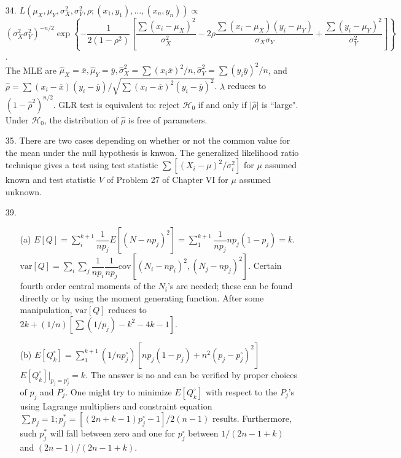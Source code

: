 \begin{enumerate}
	\item[34.] $L(\mu_X,\mu_Y,\sigma_X^2,\sigma_Y^2,\rho; (x_1,y_1),\ldots,(x_n,y_n)) \propto$ \\
	$(\sigma_X^2\sigma_Y^2)^{-n/2}\exp\left\{-\dfrac{1}{2(1-\rho^2)}\left[\dfrac{\sum(x_i-\mu_X)^2}{\sigma_X^2} -2\rho\dfrac{\sum(x_i-\mu_X)(y_i-\mu_Y)}{\sigma_X\sigma_Y} + \dfrac{\sum(y_i-\mu_Y)^2}{\sigma^2_Y}\right]\right\}$. \\
	The MLE are $\hat{\mu}_X=\overline{x},\hat{\mu}_Y=\overline{y}, \hat{\sigma}^2_X=\sum(x_i\overline{x})^2/n, \hat{\sigma}^2_Y=\sum(y_i\overline{y})^2/n$, and $\hat{\rho} = \sum(x_i-\overline{x})(y_i-\overline{y})/\sqrt{\sum(x_i-\overline{x})^2(y_i-\overline{y})^2}$. $\lambda$ reduces to $(1-\hat{\rho}^2)^{n/2}$. GLR test is equivalent to: reject $\mathscr{H}_0$ if and only if $\vert\hat{\rho}\vert$ is ``large".  Under $\mathscr{H}_0$, the distribution of $\hat{\rho}$ is free of parameters. 
	
	\item[35.] There are two cases depending on whether or not the common value for the mean under the null hypothesis is knwon. The generalized likelihood ratio technique gives a test using test statistic $\sum[(X_i-\mu)^2/\sigma_i^2]$ for $\mu$ assumed known and test statistic $V$ of Problem 27 of Chapter VI for $\mu$ assumed unknown.
	
	\item[39.] \begin{enumerate}
		\item[(a)] $E[Q] = \sum\limits_{i}^{k+1}\dfrac{1}{np_j}E[(N-np_j)^2] = \sum\limits_{1}^{k+1}\dfrac{1}{np_j}np_j(1-p_j) = k$. \\
		$\mbox{var}[Q] = \sum\limits_{i}\sum\limits_{j}\dfrac{1}{np_i}\dfrac{1}{np_j}\mbox{cov}[(N_i-np_i)^2,(N_j-np_j)^2]$. Certain fourth order central moments of the $N_i$'s are needed; these can be found directly or by using the moment generating function. After some manipulation, $\mbox{var}[Q]$ reduces to $2k+(1/n)[\sum(1/p_j) - k^2 -4k -1]$.
	
	\newpage
	
		\item[(b)] $E[Q^\circ_k] = \sum\limits_{1}^{k+1}(1/np^\circ_j)[np_j(1-p_j) + n^2(p_j-p^\circ_j)^2]$ \\
		$E[Q^\circ_k]\Big\vert_{p_j=p^\circ_j} = k$. The answer is no and can be verified by proper choices of $p_j$ and $P^\circ_j$. One might try to minimize $E[Q^\circ_k]$ with respect to the $P_j$'s using Lagrange multipliers and constraint equation $\sum p_j = 1; p_j^*= [(2n+k-1)p^\circ_j-1]/2(n-1)$ results. Furthermore, such $p^*_j$ will fall between zero and one for $p^\circ_j$ between $1/(2n-1+k)$ and $(2n-1)/(2n-1+k)$.
		

\end{enumerate}
\end{enumerate}
